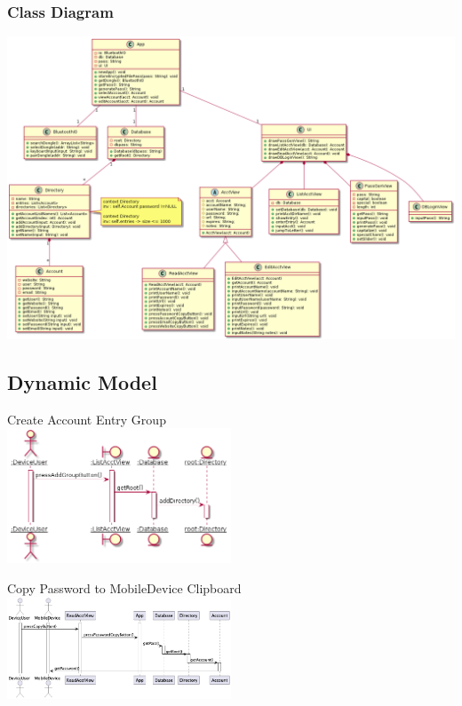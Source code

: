 \documentclass[stu]{apa7}
\begin{document}
\subsubsection{Class Diagram}

\includegraphics[width=\textwidth]{diag/group/class1.png}

\subsection{Dynamic Model}

Create Account Entry Group \\
\includegraphics[width=0.5\textwidth]{diag/gt/s1.png}

Copy Password to MobileDevice Clipboard \\
\includegraphics[width=0.5\textwidth]{diag/rjm/s1.png}

%
%
%
%
\end{document}
